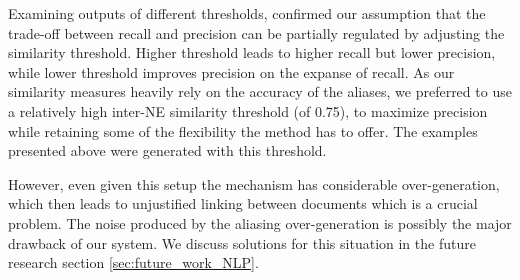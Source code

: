 Examining outputs of different thresholds, confirmed our assumption that the trade-off between recall and precision can be partially regulated by adjusting the similarity threshold. Higher threshold leads to higher recall but lower precision, while lower threshold improves precision on the expanse of recall. As our similarity measures heavily rely on the accuracy of the aliases, we preferred to use a relatively high inter-NE similarity threshold (of 0.75), to maximize precision while retaining some of the flexibility the method has to offer. The examples presented above were generated with this threshold.

However, even given this setup the mechanism has considerable over-generation, which then leads to unjustified linking between documents which is a crucial problem. The noise produced by the aliasing over-generation is possibly the major drawback of our system. We discuss solutions for this situation in the future research section \ref{sec:future_work_NLP}.


